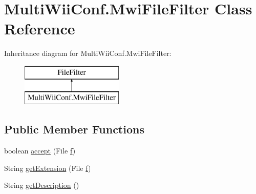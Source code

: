 \hypertarget{classMultiWiiConf_1_1MwiFileFilter}{\section{Multi\-Wii\-Conf.\-Mwi\-File\-Filter Class Reference}
\label{classMultiWiiConf_1_1MwiFileFilter}
}
Inheritance diagram for Multi\-Wii\-Conf.\-Mwi\-File\-Filter\-:\begin{figure}[H]
\begin{center}
\leavevmode
\includegraphics[height=2.000000cm]{classMultiWiiConf_1_1MwiFileFilter}
\end{center}
\end{figure}
\subsection*{Public Member Functions}
\begin{DoxyCompactItemize}
\item 
boolean \hyperlink{classMultiWiiConf_1_1MwiFileFilter_a2fc98af73a2bd1a449059b03d17fd6e0}{accept} (File \hyperlink{Uno__MultiWii__HardwarePlatform__Test_8ino_aa27fc5a637b915f1bff5f1f75a0455ab}{f})
\item 
String \hyperlink{classMultiWiiConf_1_1MwiFileFilter_a11e3fa3c2c9abd0717eee9c93181eb6a}{get\-Extension} (File \hyperlink{Uno__MultiWii__HardwarePlatform__Test_8ino_aa27fc5a637b915f1bff5f1f75a0455ab}{f})
\item 
String \hyperlink{classMultiWiiConf_1_1MwiFileFilter_ac4f941770bf069fe42ce19a0a4ba92f9}{get\-Description} ()
\end{DoxyCompactItemize}


